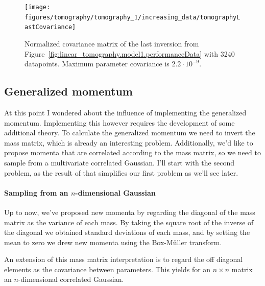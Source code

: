 \begin{figure}
	\centering
	
	\texttt{[image: figures/tomography/tomography\_1/increasing\_data/tomographyLastCovariance]}
	
	\caption{Normalized covariance matrix of the last inversion from Figure~\ref{fig:linear_tomography.model1.performanceData} with 3240 datapoints. Maximum parameter covariance is $2.2 \cdot 10^{-9}$.}
	\label{fig:linear_tomography.model1.performanceLastCovariance}
\end{figure}
%	
%	

\subsection{Generalized momentum}
At this point I wondered about the influence of implementing the generalized momentum. Implementing this however requires the development of some additional theory. To calculate the generalized momentum we need to invert the mass matrix, which is already an interesting problem. Additionally, we'd like to propose momenta that are correlated according to the mass matrix, so we need to sample from a multivariate correlated Gaussian. I'll start with the second problem, as the result of that simplifies our first problem as we'll see later.

\paragraph{Sampling from an $n$-dimensional Gaussian}
Up to now, we've proposed new momenta by regarding the diagonal of the mass matrix as the variance of each mass. By taking the square root of the inverse of the diagonal we obtained standard deviations of each mass, and by setting the mean to zero we drew new momenta using the Box-M\"uller transform.

An extension of this mass matrix interpretation is to regard the off diagonal elements as the covariance between parameters. This yields for an $n \times n$ matrix an $n$-dimensional correlated Gaussian. 


